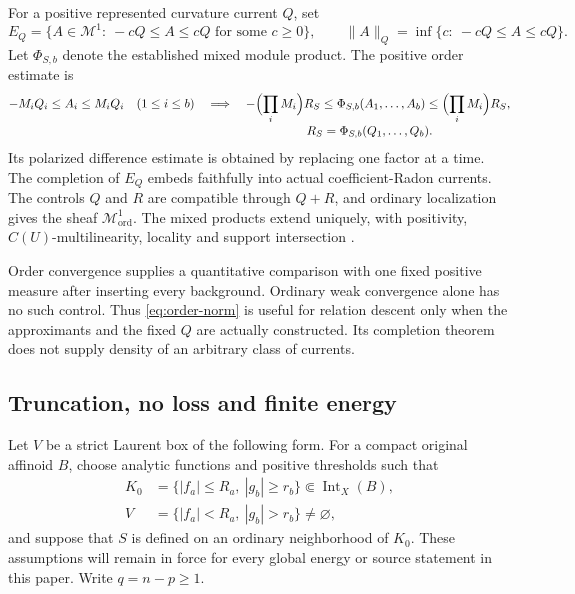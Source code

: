 \documentclass[11pt,a4paper]{article}
\newcommand{\MathEqref}[1]{{\hypersetup{linkcolor=EquationLink}\eqref{#1}}}
\theoremstyle{definition}
\theoremstyle{remark}
\numberwithin{equation}{section}
\begin{document}
For a positive represented curvature current $Q$, set
\begin{equation}
 E_Q=\{A\in\mathcal M^1:\ -cQ\le A\le cQ
                              \text{ for some }c\ge0\},\qquad
 \|A\|_Q=\inf\{c:\ -cQ\le A\le cQ\}.
                         \label{eq:order-norm}
\end{equation}
Let $\Phi_{S,b}$ denote the established mixed module product.
The positive order estimate is
\begin{align}
 -M_iQ_i\le A_i\le M_iQ_i\quad(1\le i\le b)
 &\quad\Longrightarrow\quad
 -\Bigl(\prod_iM_i\Bigr)R_S
 \le\Phi_{S,b}(A_1,\ldots,A_b)
 \le\Bigl(\prod_iM_i\Bigr)R_S,\nonumber\\[-3pt]
 &\hspace{32mm}R_S=\Phi_{S,b}(Q_1,\ldots,Q_b).
                         \label{eq:order-product}
\end{align}
Its polarized difference estimate is obtained by replacing one factor
at a time.  The completion of $E_Q$ embeds faithfully into actual
coefficient-Radon currents.  The controls $Q$ and $R$ are compatible
through $Q+R$, and ordinary localization gives the sheaf
$\mathcal M^1_{\mathrm{ord}}$.  The mixed products extend uniquely,
with positivity, $C(U)$-multilinearity, locality and support
intersection \cite{Order}.

Order convergence supplies a quantitative comparison with one fixed
positive measure after inserting every background.  Ordinary weak
convergence alone has no such control.  Thus
\MathEqref{eq:order-norm} is useful for relation descent only when the
approximants and the fixed $Q$ are actually constructed.  Its
completion theorem does not supply density of an arbitrary class of
currents.

\subsection{Truncation, no loss and finite energy}

Let $V$ be a strict Laurent box of the following form.  For a compact
original affinoid $B$, choose analytic functions and positive
thresholds such that
\begin{equation}
 \begin{split}
 K_0&=\{|f_a|\le R_a,\ |g_b|\ge r_b\}
                      \Subset\operatorname{Int}_X(B),\\
 V&=\{|f_a|<R_a,\ |g_b|>r_b\}\ne\varnothing,
 \end{split}
                         \label{eq:energy-domain}
\end{equation}
and suppose that $S$ is defined on an ordinary neighborhood of $K_0$.
These assumptions will remain in force for every global energy or
source statement in this paper.  Write $q=n-p\ge1$.
\end{document}
